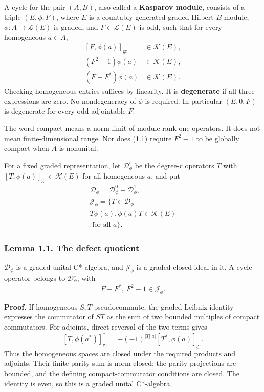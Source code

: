 \documentclass[
  11pt,
]{article}
\begin{document}
A cycle for the pair \((A,B)\), also called a \textbf{Kasparov module},
consists of a triple \((E,\phi,F)\), where \(E\) is a countably
generated graded Hilbert \(B\)-module, \(\phi:A\to\mathcal L(E)\) is
graded, and \(F\in\mathcal L(E)\) is odd, such that for every
homogeneous \(a\in A\), \[
\begin{aligned}
\left[F,\phi(a)\right]_{\mathrm{gr}}&\in\mathcal K(E),\\
(F^2-1)\phi(a)&\in\mathcal K(E),\\
(F-F^*)\phi(a)&\in\mathcal K(E).
\end{aligned}
\tag{1.1}
\] Checking homogeneous entries suffices by linearity. It is
\textbf{degenerate} if all three expressions are zero. No nondegeneracy
of \(\phi\) is required. In particular \((E,0,F)\) is degenerate for
every odd adjointable \(F\).

The word compact means a norm limit of module rank-one operators. It
does not mean finite-dimensional range. Nor does (1.1) require \(F^2-1\)
to be globally compact when \(A\) is nonunital.

For a fixed graded representation, let \(\mathcal D_\phi^r\) be the
degree-\(r\) operators \(T\) with
\([T,\phi(a)]_{\mathrm{gr}}\in\mathcal K(E)\) for all homogeneous \(a\),
and put \[
\begin{gathered}
\mathcal D_\phi=\mathcal D_\phi^0+\mathcal D_\phi^1,\\
\mathcal J_\phi=\{T\in\mathcal D_\phi\mid\\
T\phi(a),\phi(a)T\in\mathcal K(E)\\
\text{ for all }a\}.
\end{gathered}
\tag{1.2}
\]

\subsubsection{Lemma 1.1. The defect
quotient}\label{lemma-1.1.-the-defect-quotient}

\(\mathcal D_\phi\) is a graded unital C*-algebra, and
\(\mathcal J_\phi\) is a graded closed ideal in it. A cycle operator
belongs to \(\mathcal D_\phi^1\), with \[
F-F^*,\ F^2-1\in\mathcal J_\phi.
\tag{1.3}
\]

\textbf{Proof.} If homogeneous \(S,T\) pseudocommute, the graded Leibniz
identity expresses the commutator of \(ST\) as the sum of two bounded
multiples of compact commutators. For adjoints, direct reversal of the
two terms gives \[
[T,\phi(a^*)]_{\mathrm{gr}}^*
=-(-1)^{|T||a|}[T^*,\phi(a)]_{\mathrm{gr}}.
\] Thus the homogeneous spaces are closed under the required products
and adjoints. Their finite parity sum is norm closed: the parity
projections are bounded, and the defining compact-commutator conditions
are closed. The identity is even, so this is a graded unital C*-algebra.
\end{document}
